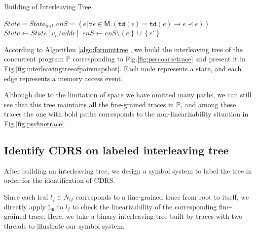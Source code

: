 \documentclass[runningheads]{llncs}
\newcommand{\pair}[1]{{\langle{#1}\rangle}}
\newcommand{\set}[1]{\left\{{#1}\right\}}
\begin{document}
\begin{algorithm}
    \caption{Building of Interleaving Tree}\label{algo:forminttree}
    \begin{algorithmic}[1]
        \State $\mathit{State} = \mathit{State}_{init}$
        \State $\mathit{enS} = \left\{ e | \forall \epsilon\in \mathsf{M} .(\mathtt{td}(\epsilon)=\mathtt{td}(e)\longrightarrow e\prec \epsilon)\right\}$
            \State {}
            \For{$e(addr,v_n)^{\pair{o,t}} \leftarrow \mathit{enS}$}
                \State {}
                \State $\mathit{State} \gets \mathit{State[v_n/addr]}$
                \State $\mathit{enS} \gets \mathit{enS}\setminus \set{e} \cup \set{e'}$
                \State {}
            \EndFor
        \EndFunction
    \end{algorithmic}
\end{algorithm}

\begin{example} 
According to Algorithm \ref{algo:forminttree}, we build the interleaving tree of the concurrent program $\mathbb{P}$ corresponding to Fig.\ref{fig:psscoarsetrace} and present it in Fig.\ref{fig:interleavingtreeofpairsnapshot}. Each node represents a state, and each edge represents a memory access event.

Although due to the limitation of space we have omitted many paths, we can still see that this tree maintains all the fine-grained traces in $\mathbb{P}$, and among these traces the one with bold paths corresponds to 
the non-linearizability situation in Fig.\ref{fig:pssfinetrace}.
\end{example}






\subsection{Identify CDRS on labeled interleaving tree}\label{sec:identifycdrs}
After building an interleaving tree, we design a symbol system to label the tree in order for the identification of CDRS.



Since each leaf $l_f\in N_{lf}$ corresponds to a fine-grained trace from root to itself, we directly apply $\mathtt{L_n}$ to $l_f$ to check the linearizability of the corresponding fine-grained trace. Here, we take a binary interleaving tree built by traces with two threads to illustrate our symbol system.
\end{document}
